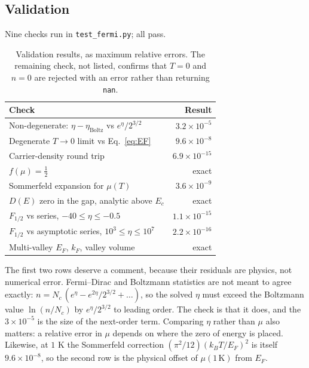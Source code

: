 \documentclass[aps,prb,reprint,nofootinbib]{revtex4-2}
\begin{document}
\subsection{Validation}

Nine checks run in \texttt{test\_fermi.py}; all pass.

\begin{table}[h]
\centering
\small
\begin{tabular}{lr}
\toprule
\textbf{Check} & \textbf{Result} \\
\midrule
Non-degenerate: $\eta-\eta_{\text{Boltz}}$ vs $e^{\eta}/2^{3/2}$ & $3.2\times10^{-5}$ \\
Degenerate $T\to0$ limit vs Eq.~\eqref{eq:EF}     & $9.6\times10^{-8}$ \\
Carrier-density round trip                        & $6.9\times10^{-15}$ \\
$f(\mu)=\tfrac12$                                 & exact \\
Sommerfeld expansion for $\mu(T)$                 & $3.6\times10^{-9}$ \\
$D(E)$ zero in the gap, analytic above $E_c$      & exact \\
$F_{1/2}$ vs series, $-40\le\eta\le-0.5$          & $1.1\times10^{-15}$ \\
$F_{1/2}$ vs asymptotic series, $10^3\le\eta\le10^7$ & $2.2\times10^{-16}$ \\
Multi-valley $E_F$, $k_F$, valley volume          & exact \\
\bottomrule
\end{tabular}
\caption{Validation results, as maximum relative errors. The remaining check, not listed,
confirms that $T=0$ and $n=0$ are rejected with an error rather than returning \texttt{nan}.}
\label{tab:valid}
\end{table}

The first two rows deserve a comment, because their residuals are physics, not numerical error.
Fermi--Dirac and Boltzmann statistics are not meant to agree exactly:
$n=N_c\,(e^\eta-e^{2\eta}/2^{3/2}+\dots)$, so the solved $\eta$ must exceed the Boltzmann value
$\ln(n/N_c)$ by $e^\eta/2^{3/2}$ to leading order. The check is that it does, and the
$3\times10^{-5}$ is the size of the next-order term. Comparing $\eta$ rather than $\mu$ also
matters: a relative error in $\mu$ depends on where the zero of energy is placed. Likewise, at
$1$ K the Sommerfeld correction $(\pi^2/12)(k_BT/E_F)^2$ is itself $9.6\times10^{-8}$, so the
second row is the physical offset of $\mu(1\,\mathrm{K})$ from $E_F$.
\end{document}
